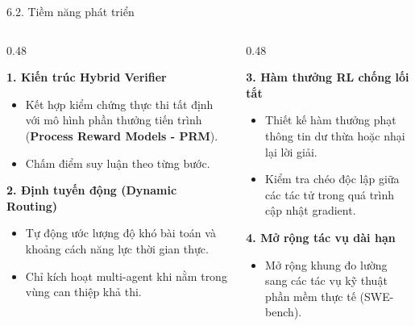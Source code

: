 \documentclass[aspectratio=169,10pt]{beamer}
\begin{document}
\begin{frame}{6.2. Tiềm năng phát triển}
  \begin{columns}[t]
    \begin{column}{0.48\textwidth}
      \begin{exampleblock}{\textbf{1. Kiến trúc Hybrid Verifier}}
        \begin{itemize}\small
          \item Kết hợp kiểm chứng thực thi tất định với mô hình phần thưởng tiến trình (\textbf{Process Reward Models - PRM}).
          \item Chấm điểm suy luận theo từng bước.
        \end{itemize}
      \end{exampleblock}
      
      \begin{exampleblock}{\textbf{2. Định tuyến động (Dynamic Routing)}}
        \begin{itemize}\small
          \item Tự động ước lượng độ khó bài toán và khoảng cách năng lực thời gian thực.
          \item Chỉ kích hoạt multi-agent khi nằm trong vùng can thiệp khả thi.
        \end{itemize}
      \end{exampleblock}
    \end{column}
    
    \begin{column}{0.48\textwidth}
      \begin{exampleblock}{\textbf{3. Hàm thưởng RL chống lối tắt}}
        \begin{itemize}\small
          \item Thiết kế hàm thưởng phạt thông tin dư thừa hoặc nhại lại lời giải.
          \item Kiểm tra chéo độc lập giữa các tác tử trong quá trình cập nhật gradient.
        \end{itemize}
      \end{exampleblock}
      
      \begin{block}{\textbf{4. Mở rộng tác vụ dài hạn}}
        \begin{itemize}\small
          \item Mở rộng khung đo lường sang các tác vụ kỹ thuật phần mềm thực tế (SWE-bench).
        \end{itemize}
      \end{block}
    \end{column}
  \end{columns}
\end{frame}
\end{document}
